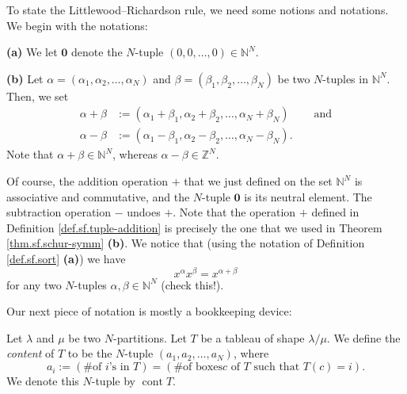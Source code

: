 To state the Littlewood--Richardson rule, we need some notions and notations.
We begin with the notations:

\begin{definition}
\label{def.sf.tuple-addition}\textbf{(a)} We let $\mathbf{0}$ denote the
$N$-tuple $\left(  0,0,\ldots,0\right)  \in\mathbb{N}^{N}$. \medskip

\textbf{(b)} Let $\alpha=\left(  \alpha_{1},\alpha_{2},\ldots,\alpha
_{N}\right)  $ and $\beta=\left(  \beta_{1},\beta_{2},\ldots,\beta_{N}\right)
$ be two $N$-tuples in $\mathbb{N}^{N}$. Then, we set%
\begin{align*}
\alpha+\beta &  :=\left(  \alpha_{1}+\beta_{1},\alpha_{2}+\beta_{2}%
,\ldots,\alpha_{N}+\beta_{N}\right)  \ \ \ \ \ \ \ \ \ \ \text{and}\\
\alpha-\beta &  :=\left(  \alpha_{1}-\beta_{1},\alpha_{2}-\beta_{2}%
,\ldots,\alpha_{N}-\beta_{N}\right)  .
\end{align*}
Note that $\alpha+\beta\in\mathbb{N}^{N}$, whereas $\alpha-\beta\in
\mathbb{Z}^{N}$.
\end{definition}

Of course, the addition operation $+$ that we just defined on the set
$\mathbb{N}^{N}$ is associative and commutative, and the $N$-tuple
$\mathbf{0}$ is its neutral element. The subtraction operation $-$ undoes $+$.
Note that the operation $+$ defined in Definition \ref{def.sf.tuple-addition}
is precisely the one that we used in Theorem \ref{thm.sf.schur-symm}
\textbf{(b)}. We notice that (using the notation of Definition
\ref{def.sf.sort} \textbf{(a)}) we have%
\begin{equation}
x^{\alpha}x^{\beta}=x^{\alpha+\beta} \label{eq.def.sf.tuple-addition.xab}%
\end{equation}
for any two $N$-tuples $\alpha,\beta\in\mathbb{N}^{N}$ (check this!).

Our next piece of notation is mostly a bookkeeping device:

\begin{definition}
\label{def.sf.content}Let $\lambda$ and $\mu$ be two $N$-partitions. Let $T$
be a tableau of shape $\lambda/\mu$. We define the \emph{content} of $T$ to be
the $N$-tuple $\left(  a_{1},a_{2},\ldots,a_{N}\right)  $, where%
\[
a_{i}:=\left(  \text{\# of }i\text{'s in }T\right)  =\left(  \text{\# of boxes
}c\text{ of }T\text{ such that }T\left(  c\right)  =i\right)  .
\]
We denote this $N$-tuple by $\operatorname*{cont}T$.
\end{definition}

